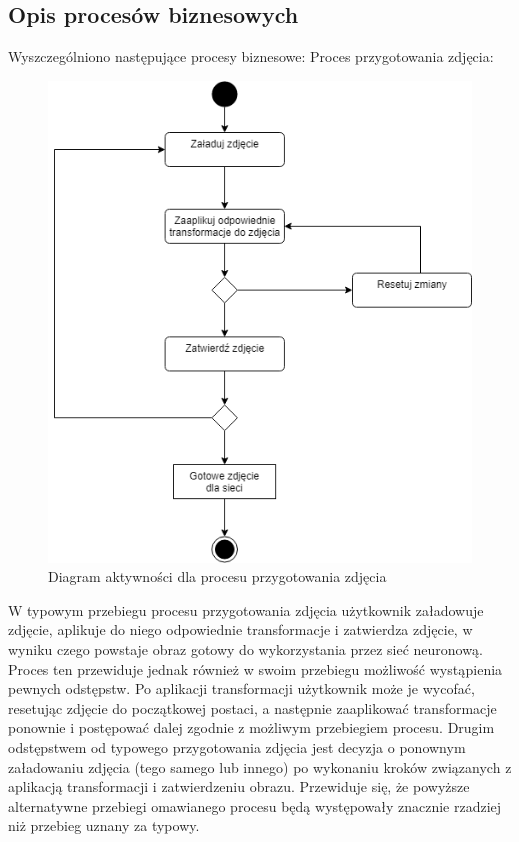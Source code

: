 \documentclass[polish,12pt]{aghthesis}
\begin{document}
\newpage
\subsection{Opis procesów biznesowych}

\par\noindent Wyszczególniono następujące procesy biznesowe:
\vspace{5mm}
\newline Proces przygotowania zdjęcia:

\begin{figure}[h]
    \centering
    \label{fig:prepare-image-proccess}    \includegraphics[width=12cm]{images/proces_przygotowania.png}
    \caption{Diagram aktywności dla procesu przygotowania zdjęcia}
\end{figure}

\par W typowym przebiegu procesu przygotowania zdjęcia użytkownik załadowuje zdjęcie, aplikuje do niego odpowiednie transformacje i zatwierdza zdjęcie, w wyniku czego powstaje obraz gotowy do wykorzystania przez sieć neuronową. Proces ten przewiduje jednak również w swoim przebiegu możliwość wystąpienia pewnych odstępstw. Po aplikacji transformacji użytkownik może je wycofać, resetując zdjęcie do początkowej postaci, a następnie zaaplikować transformacje ponownie i postępować dalej zgodnie z możliwym przebiegiem procesu. Drugim odstępstwem od typowego przygotowania zdjęcia jest decyzja o ponownym załadowaniu zdjęcia (tego samego lub innego) po wykonaniu kroków związanych z aplikacją transformacji i zatwierdzeniu obrazu. Przewiduje się, że powyższe alternatywne przebiegi omawianego procesu będą występowały znacznie rzadziej niż przebieg uznany za typowy.
\end{document}
